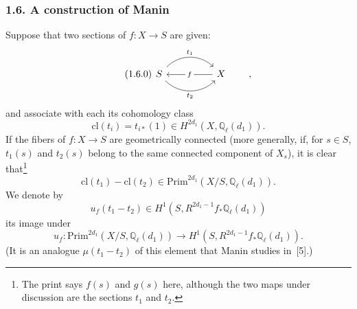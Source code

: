 \subsubsection*{1.6. A construction of Manin}
Suppose that two sections of $f:X\longrightarrow S$ are given:
\begin{equation}\tag{1.6.0}
\begin{tikzcd}[column sep=huge]
S \arrow[r, bend left=45, "t_1"]
  \arrow[r, bend right=45, "t_2"']
& X \arrow[l, "f" description]
\end{tikzcd}
\qquad ,
\end{equation}
and associate with each its cohomology class
\begin{equation}\tag{1.6.1}
\mathrm{cl}(t_i)=t_{i*}(1)
\in H^{2d_1}(X,\mathbb Q_\ell(d_1)).
\end{equation}
If the fibers of $f:X\longrightarrow S$ are geometrically connected
(more generally, if, for $s\in S$, $t_1(s)$ and $t_2(s)$ belong to the same
connected component of $X_s$), it is clear that\footnote{The print says
$f(s)$ and $g(s)$ here, although the two maps under discussion are the
sections $t_1$ and $t_2$.}
\begin{equation}\tag{1.6.2}
\mathrm{cl}(t_1)-\mathrm{cl}(t_2)
\in\mathrm{Prim}^{2d_1}(X/S,\mathbb Q_\ell(d_1)).
\end{equation}
We denote by
\begin{equation}\tag{1.6.3}
u_f(t_1-t_2)\in
H^1(S,R^{2d_1-1}f_*\mathbb Q_\ell(d_1))
\end{equation}
its image under
\begin{equation}\tag{1.6.4}
u_f:\mathrm{Prim}^{2d_1}(X/S,\mathbb Q_\ell(d_1))
\longrightarrow H^1(S,R^{2d_1-1}f_*\mathbb Q_\ell(d_1)).
\end{equation}
(It is an analogue $\mu(t_1-t_2)$ of this element that Manin studies
in~[5].)

